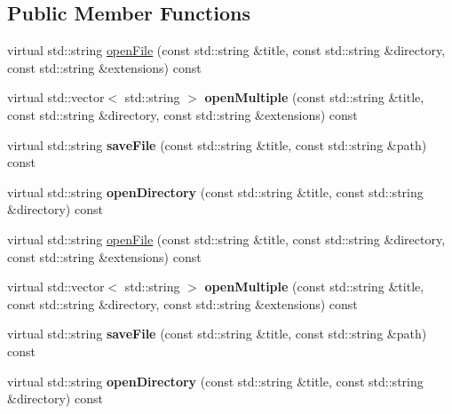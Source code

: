 \subsection*{Public Member Functions}
\begin{DoxyCompactItemize}
\item 
virtual std\+::string \hyperlink{classPlayerFileDialogServiceMac_a8752560c26dc0d249dd33ea47309a289}{open\+File} (const std\+::string \&title, const std\+::string \&directory, const std\+::string \&extensions) const
\item 
\mbox{\label{classPlayerFileDialogServiceMac_a19539d467217a684ae710afc5753a7ae}} 
virtual std\+::vector$<$ std\+::string $>$ {\bfseries open\+Multiple} (const std\+::string \&title, const std\+::string \&directory, const std\+::string \&extensions) const
\item 
\mbox{\label{classPlayerFileDialogServiceMac_a5163f9b8fcc3dce85817ef3e4786ea40}} 
virtual std\+::string {\bfseries save\+File} (const std\+::string \&title, const std\+::string \&path) const
\item 
\mbox{\label{classPlayerFileDialogServiceMac_a8487d8ebce67d1c4797732b0c859d96e}} 
virtual std\+::string {\bfseries open\+Directory} (const std\+::string \&title, const std\+::string \&directory) const
\item 
virtual std\+::string \hyperlink{classPlayerFileDialogServiceMac_a79a6a3ca54cdb15fec5d0a9caeafabde}{open\+File} (const std\+::string \&title, const std\+::string \&directory, const std\+::string \&extensions) const
\item 
\mbox{\label{classPlayerFileDialogServiceMac_a4482c7c1e396b65a53e5145ff61cc207}} 
virtual std\+::vector$<$ std\+::string $>$ {\bfseries open\+Multiple} (const std\+::string \&title, const std\+::string \&directory, const std\+::string \&extensions) const
\item 
\mbox{\label{classPlayerFileDialogServiceMac_af21fe69aac963ce4b06e48fc96c321fe}} 
virtual std\+::string {\bfseries save\+File} (const std\+::string \&title, const std\+::string \&path) const
\item 
\mbox{\label{classPlayerFileDialogServiceMac_a0246e49e5a251ec7690f1136e7b42564}} 
virtual std\+::string {\bfseries open\+Directory} (const std\+::string \&title, const std\+::string \&directory) const
\end{DoxyCompactItemize}


